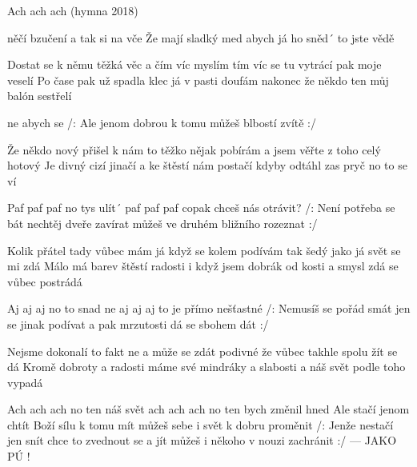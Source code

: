 \begin{TEXT}{Ach ach ach (hymna 2018)}

\SLOKA {} něčí bzučení a \NL
tak  si  na vče\NL
Že  mají sladký med  abych já ho sněd´\NL
to   jste vědě\NL

Dostat se k němu těžká věc a čím víc myslím tím víc se\NL
tu vytrácí pak moje veselí\NL
Po čase pak už spadla klec já v pasti doufám nakonec\NL
že někdo ten můj balón sestřelí

\REFREN

 \NL
{} ne abych se \NL
/: Ale  jenom  dobrou  k tomu \NL
můžeš  blbostí  zvítě :/

\SLOKA Že někdo nový přišel k nám to těžko nějak pobírám\NL
a jsem věřte z toho celý hotový\NL
Je divný cizí jinačí a ke štěstí nám postačí\NL
kdyby odtáhl zas pryč no to se ví

\REFREN Paf paf paf no tys ulít´\NL
         paf paf paf copak chceš nás otrávit?\NL
/: Není potřeba se bát\NL
 nechtěj dveře zavírat\NL
můžeš ve druhém bližního rozeznat :/

\SLOKA Kolik přátel tady vůbec mám já když se kolem podívám\NL
tak šedý jako já svět se mi zdá\NL
Málo má barev štěstí radosti i když jsem dobrák od kosti\NL
a smysl zdá se vůbec postrádá

\REFREN Aj aj aj no to snad ne\NL
aj aj aj to je přímo nešťastné\NL
/: Nemusíš se pořád smát\NL
jen se jinak podívat\NL
a pak mrzutosti dá se sbohem dát :/

\SLOKA Nejsme dokonalí to fakt ne a může se zdát podivné\NL
že vůbec takhle spolu žít se dá\NL
Kromě dobroty a radosti máme své mindráky a slabosti\NL
a náš svět podle toho vypadá

\REFREN Ach ach ach no ten náš svět\NL
ach ach ach no ten bych změnil hned\NL
Ale stačí jenom chtít\NL
Boží sílu k tomu mít\NL
můžeš sebe i svět k dobru proměnit\NL
/: Jenže nestačí jen snít\NL
chce to zvednout se a jít\NL
můžeš i někoho v nouzi zachránit :/\NL
\hspace*{2cm}--- JAKO PÚ !
\end{TEXT}